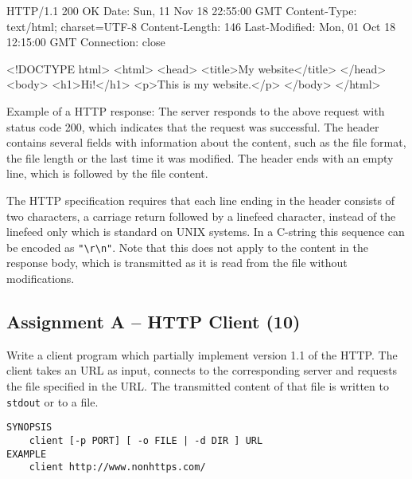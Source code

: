 \begin{center}
\begin{minipage}{8cm}
\begin{osuefmtcode}
HTTP/1.1 200 OK
Date: Sun, 11 Nov 18 22:55:00 GMT
Content-Type: text/html; charset=UTF-8
Content-Length: 146
Last-Modified: Mon, 01 Oct 18 12:15:00 GMT
Connection: close

<!DOCTYPE html>
<html>
  <head>
    <title>My website</title>
  </head>
  <body>
    <h1>Hi!</h1>
    <p>This is my website.</p>
  </body>
</html>
\end{osuefmtcode}
\end{minipage}
\begin{minipage}{12cm}
\vspace{3mm}
\footnotesize{Example of a HTTP response:
The server responds to the above request with status code 200,
which indicates that the request was successful.
The header contains several fields with information about the content,
such as the file format, the file length or the last time it was modified.
The header ends with an empty line, which is followed by the file content.}
\end{minipage}
\end{center}

The HTTP specification requires
that each line ending in the header consists of two characters,
a carriage return followed by a linefeed character,
instead of the linefeed only which is standard on UNIX systems.
In a C-string this sequence can be encoded as \verb|"\r\n"|.
Note that this does not apply to the content in the response body,
which is transmitted as it is read from the file without modifications.


\subsection*{Assignment A -- HTTP Client (10)}

Write a client program
which partially implement version 1.1 of the HTTP.
The client takes an URL as input,
connects to the corresponding server
and requests the file specified in the URL.
The transmitted content of that file is written to \verb|stdout| or to a file.

\vspace{-3mm}

\begin{verbatim}
SYNOPSIS
    client [-p PORT] [ -o FILE | -d DIR ] URL
EXAMPLE
    client http://www.nonhttps.com/
\end{verbatim}

